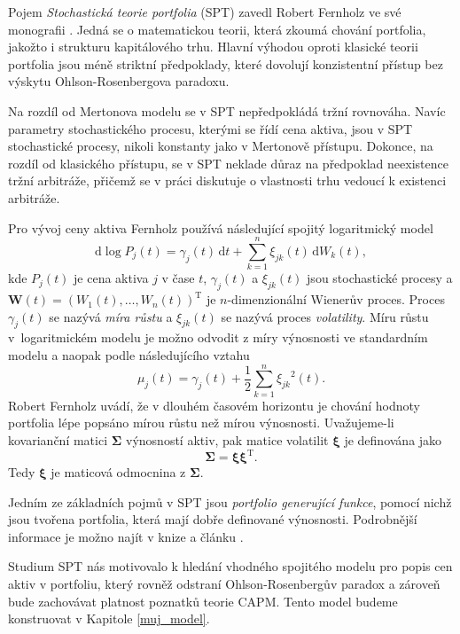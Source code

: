 \documentclass[a4paper,12pt]{report}
\theoremstyle{definition} \newtheorem{definice}[veta]{Definice}
\theoremstyle{remark}
\begin{document}
Pojem \textit{Stochastická teorie portfolia} (SPT) zavedl Robert Fernholz ve své monografii \cite{fern}.
Jedná se o matematickou teorii, která zkoumá chování portfolia, jakožto i strukturu kapitálového trhu.
Hlavní výhodou oproti klasické teorii portfolia jsou méně  striktní předpoklady, které dovolují konzistentní přístup bez výskytu Ohlson-Rosenbergova paradoxu.

Na rozdíl od Mertonova modelu se v SPT nepředpokládá tržní rovnováha.
Navíc parametry stochastického procesu, kterými se řídí cena aktiva, jsou v SPT stochastické procesy, nikoli konstanty jako v Mertonově přístupu.
Dokonce, na rozdíl od klasického přístupu, se v SPT neklade důraz na předpoklad neexistence tržní arbitráže, přičemž se v práci diskutuje o vlastnosti trhu vedoucí k existenci arbitráže. 

Pro vývoj ceny aktiva Fernholz používá následující spojitý logaritmický model
$$\mathrm{d}\log P_j(t)=\gamma_j(t)\,\mathrm{d}t+\sum_{k=1}^{n}\xi_{jk}(t)\,\mathrm{d}W_k(t),$$
kde $P_j(t)$ je cena aktiva $j$ v čase $t$, $\gamma_j(t)$ a $\xi_{jk}(t)$ jsou stochastické procesy a $\boldsymbol{W}(t)=(W_1(t),\dots,W_n(t))^\mathrm{T}$ je $n$-dimenzionální Wienerův proces. 
Proces $\gamma_j(t)$ se nazývá \textit{míra růstu} a $\xi_{jk}(t)$ se nazývá proces \textit{volatility}.
Míru růstu v~logaritmickém modelu je možno odvodit z míry výnosnosti ve standardním modelu a naopak podle následujícího vztahu
$$\mu_j(t)=\gamma_j(t)+\frac12\sum_{k=1}^{n}{\xi_{jk}}^2(t).$$
Robert Fernholz uvádí, že v dlouhém časovém horizontu je chování hodnoty portfolia lépe popsáno mírou růstu než mírou výnosnosti.
Uvažujeme-li kovarianční matici $\boldsymbol{\Sigma}$ výnosností aktiv, pak matice volatilit $\boldsymbol{\xi}$ je definována jako
$$\boldsymbol{\Sigma}=\boldsymbol{\xi}\boldsymbol{\xi}^\mathrm{T}.$$
Tedy $\boldsymbol{\xi}$ je maticová odmocnina z $\boldsymbol{\Sigma}$.

Jedním ze základních pojmů v SPT jsou \textit{portfolio generující funkce}, pomocí nichž jsou tvořena portfolia, která mají dobře definované výnosnosti. 
Podrobnější informace je možno najít v knize \cite{fern} a článku \cite{kara}.

Studium SPT nás motivovalo k hledání vhodného spojitého modelu pro popis cen aktiv v portfoliu, který rovněž odstraní Ohlson-Rosenbergův paradox a zároveň bude zachovávat platnost poznatků teorie CAPM.
Tento model budeme konstruovat v Kapitole \ref{muj_model}.


\end{document}
